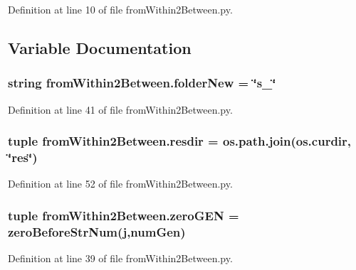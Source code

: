 Definition at line 10 of file from\-Within2\-Between.\-py.



\subsection{Variable Documentation}
\hypertarget{namespacefrom_within2_between_abe0ecb557a225c5832c6567139bf91b4}{
\subsubsection[{folder\-New}]{\setlength{\rightskip}{0pt plus 5cm}string from\-Within2\-Between.\-folder\-New = \char`\"{}s\-\_\-\char`\"{}}}\label{namespacefrom_within2_between_abe0ecb557a225c5832c6567139bf91b4}


Definition at line 41 of file from\-Within2\-Between.\-py.

\hypertarget{namespacefrom_within2_between_a47de7eeb1d8dcbb763d1f9db53fe958f}{
\subsubsection[{resdir}]{\setlength{\rightskip}{0pt plus 5cm}tuple from\-Within2\-Between.\-resdir = os.\-path.\-join(os.\-curdir, \char`\"{}res\char`\"{})}}\label{namespacefrom_within2_between_a47de7eeb1d8dcbb763d1f9db53fe958f}


Definition at line 52 of file from\-Within2\-Between.\-py.

\hypertarget{namespacefrom_within2_between_a1cd31aebf09d421ec4c6ef89fa122662}{
\subsubsection[{zero\-G\-E\-N}]{\setlength{\rightskip}{0pt plus 5cm}tuple from\-Within2\-Between.\-zero\-G\-E\-N = {\bf zero\-Before\-Str\-Num}({\bf j},num\-Gen)}}\label{namespacefrom_within2_between_a1cd31aebf09d421ec4c6ef89fa122662}


Definition at line 39 of file from\-Within2\-Between.\-py.


